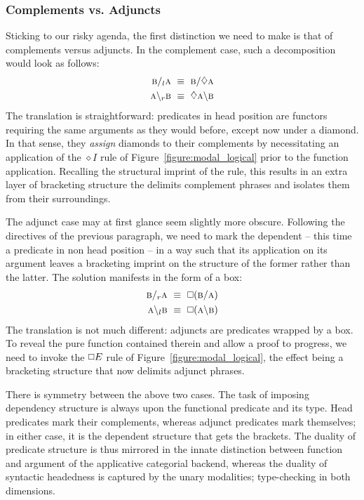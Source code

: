\subsubsection{Complements vs. Adjuncts}
Sticking to our risky agenda, the first distinction we need to make is that of complements versus adjuncts.
In the complement case, such a decomposition would look as follows:
\begin{align}
	\prop{b} \divright_l \prop{a} \ \equiv \ \prop{b} \divright \diamond \prop{a} \\
	\prop{a} \divleft_r \prop{b} \ \equiv \ \diamond  \prop{a} \divleft \prop{b}
\end{align}
The translation is straightforward: predicates in head position are functors requiring the same arguments as they would before, except now under a diamond.
In that sense, they \textit{assign} diamonds to their complements by necessitating an application of the $\diamond I$ rule of Figure~\ref{figure:modal_logical} prior to the function application.
Recalling the structural imprint of the rule, this results in an extra layer of bracketing structure the delimits complement phrases and isolates them from their surroundings.

The adjunct case may at first glance seem slightly more obscure.
Following the directives of the previous paragraph, we need to mark the dependent -- this time a predicate in non head position -- in a way such that its application on its argument leaves a bracketing imprint on the structure of the former rather than the latter.
The solution manifests in the form of a box:
\begin{align}
	\prop{b} \divright_r \prop{a} \ \equiv \ \bx (\prop{b} \divright \prop{a}) \\
	\prop{a} \divleft_l \prop{b} \ \equiv \ \bx (\prop{a} \divleft \prop{b})
\end{align}
The translation is not much different: adjuncts are predicates wrapped by a box.
To reveal the pure function contained therein and allow a proof to progress, we need to invoke the $\bx E$ rule of Figure~\ref{figure:modal_logical}, the effect being a bracketing structure that now delimits adjunct phrases.

There is symmetry between the above two cases.
The task of imposing dependency structure is always upon the functional predicate and its type.
Head predicates mark their complements, whereas adjunct predicates mark themselves; in either case, it is the dependent structure that gets the brackets.
The duality of predicate structure is thus mirrored in the innate distinction between function and argument of the applicative categorial backend, whereas the duality of syntactic headedness is captured by the unary modalities; type-checking in both dimensions.

